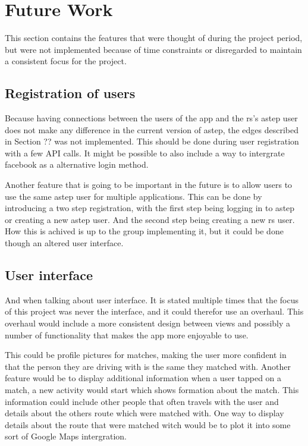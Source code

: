 \section{Future Work}
This section contains the features that were thought of during the project period, but were not implemented because of time constraints or disregarded to maintain a consistent focus for the project.

\subsection{Registration of users}
Because having connections between the users of the app and the \gls{rs}'s \gls{astep} user does not make any difference in the current version of \gls{astep}, the edges described in Section ?? \todo{} was not implemented.
This should be done during user registration with a few API calls.
It might be possible to also include a way to intergrate facebook as a alternative login method.

Another feature that is going to be important in the future is to allow users to use the same \gls{astep} user for multiple applications.
This can be done by introducing a two step registration, with the first step being logging in to \gls{astep} or creating a new \gls{astep} user.
And the second step being creating a new \gls{rs} user.
How this is achived is up to the group implementing it, but it could be done though an altered user interface.

\subsection{User interface}
And when talking about user interface.
It is stated multiple times that the focus of this project was never the interface, and it could therefor use an overhaul.
This overhaul would include a more consistent design between views and possibly a number of functionality that makes the app more enjoyable to use.

This could be profile pictures for matches, making the user more confident in that the person they are driving with is the same they matched with.
Another feature would be to display additional information when a user tapped on a match, a new activity would start which shows formation about the match.
This information could include other people that often travels with the user and details about the others route which were matched with.
One way to display details about the route that were matched witch would be to plot it into some sort of Google Maps intergration.

